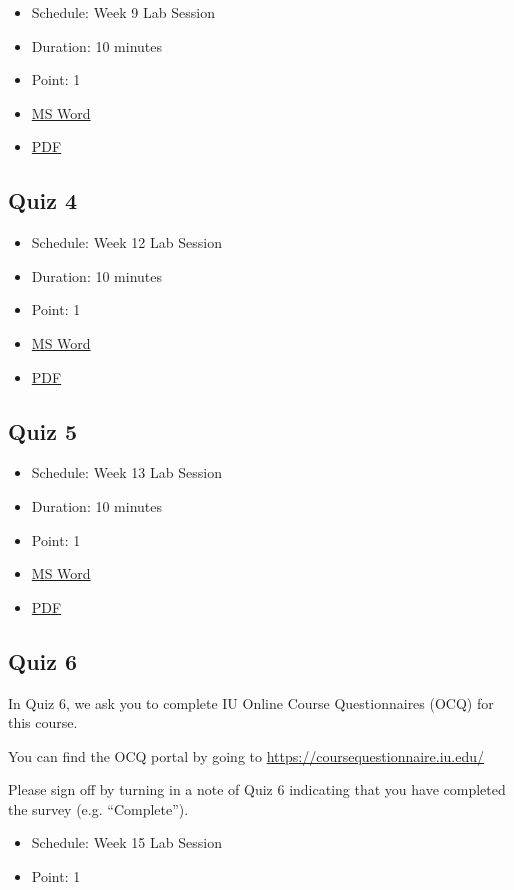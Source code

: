 \begin{itemize}

\item
  Schedule: Week 9 Lab Session
\item
  Duration: 10 minutes
\item
  Point: 1
\item
  \href{https://drive.google.com/open?id=0B88HKpainTSfejluSnRkQW5Oakk}{MS
  Word}
\item
  \href{https://drive.google.com/open?id=0B88HKpainTSfNmR5b2M0Um1NV28}{PDF}
\end{itemize}

\subsection{Quiz 4}\label{quiz-4}

\begin{itemize}

\item
  Schedule: Week 12 Lab Session
\item
  Duration: 10 minutes
\item
  Point: 1
\item
  \href{https://drive.google.com/open?id=0B88HKpainTSfYzJuN29pY1JoSFU}{MS
  Word}
\item
  \href{https://drive.google.com/open?id=0B88HKpainTSfNGhPMlBadXJURm8}{PDF}
\end{itemize}

\subsection{Quiz 5}\label{quiz-5}

\begin{itemize}

\item
  Schedule: Week 13 Lab Session
\item
  Duration: 10 minutes
\item
  Point: 1
\item
  \href{https://drive.google.com/open?id=0B88HKpainTSfdUl5QktlUGx1dFU}{MS
  Word}
\item
  \href{https://drive.google.com/open?id=0B88HKpainTSfZFU4dE9acktNMG8}{PDF}
\end{itemize}

\subsection{Quiz 6}\label{quiz-6}

In Quiz 6, we ask you to complete IU Online Course Questionnaires (OCQ)
for this course.

You can find the OCQ portal by going to
\url{https://coursequestionnaire.iu.edu/}

Please sign off by turning in a note of Quiz 6 indicating that you have
completed the survey (e.g. ``Complete'').

\begin{itemize}

\item
  Schedule: Week 15 Lab Session
\item
  Point: 1
\end{itemize}
